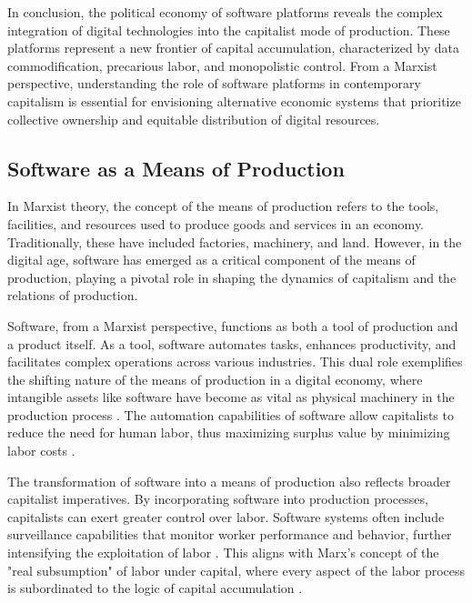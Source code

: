 \begin{refsection}
In conclusion, the political economy of software platforms reveals the complex integration of digital technologies into the capitalist mode of production. These platforms represent a new frontier of capital accumulation, characterized by data commodification, precarious labor, and monopolistic control. From a Marxist perspective, understanding the role of software platforms in contemporary capitalism is essential for envisioning alternative economic systems that prioritize collective ownership and equitable distribution of digital resources.

\subsection{Software as a Means of Production}

In Marxist theory, the concept of the means of production refers to the tools, facilities, and resources used to produce goods and services in an economy. Traditionally, these have included factories, machinery, and land. However, in the digital age, software has emerged as a critical component of the means of production, playing a pivotal role in shaping the dynamics of capitalism and the relations of production.

Software, from a Marxist perspective, functions as both a tool of production and a product itself. As a tool, software automates tasks, enhances productivity, and facilitates complex operations across various industries. This dual role exemplifies the shifting nature of the means of production in a digital economy, where intangible assets like software have become as vital as physical machinery in the production process \cite[pp.~102-104]{fuchs2014digital}. The automation capabilities of software allow capitalists to reduce the need for human labor, thus maximizing surplus value by minimizing labor costs \cite[pp.~709-711]{marx2008capital}.

The transformation of software into a means of production also reflects broader capitalist imperatives. By incorporating software into production processes, capitalists can exert greater control over labor. Software systems often include surveillance capabilities that monitor worker performance and behavior, further intensifying the exploitation of labor \cite[pp.~28-30]{moody2017on}. This aligns with Marx's concept of the "real subsumption" of labor under capital, where every aspect of the labor process is subordinated to the logic of capital accumulation \cite[pp.~1021-1023]{marx2008capital}.


\end{refsection}
